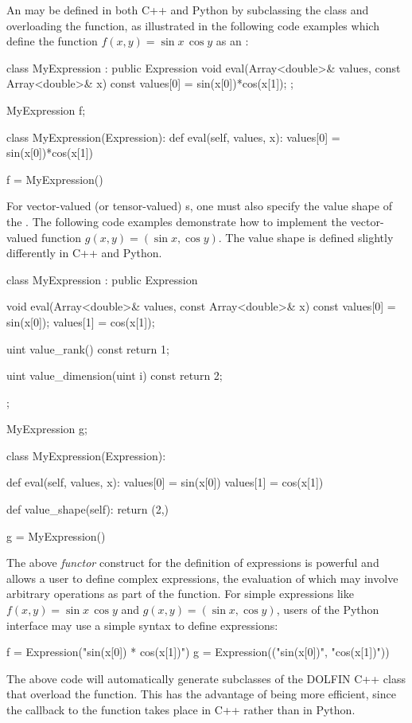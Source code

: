 An  may be defined in both C++ and Python by
subclassing the  class and overloading the 
function, as illustrated in the following code examples which define
the function $f(x, y) = \sin x \, \cos y$ as an :
\begin{c++}
class MyExpression : public Expression
{
  void eval(Array<double>& values, const Array<double>& x) const
  {
    values[0] = sin(x[0])*cos(x[1]);
  }
};

MyExpression f;
\end{c++}
\begin{python}
class MyExpression(Expression):
    def eval(self, values, x):
        values[0] = sin(x[0])*cos(x[1])

f = MyExpression()
\end{python}
For vector-valued (or tensor-valued) s, one must also
specify the value shape of the . The following code
examples demonstrate how to implement the vector-valued function $g(x,
y) = (\sin x, \cos y)$. The value shape is defined slightly
differently in C++ and Python.
\begin{c++}
class MyExpression : public Expression
{
  void eval(Array<double>& values, const Array<double>& x) const
  {
    values[0] = sin(x[0]);
    values[1] = cos(x[1]);
  }

  uint value_rank() const
  {
    return 1;
  }

  uint value_dimension(uint i) const
  {
    return 2;
  }
};

MyExpression g;
\end{c++}
\begin{python}
class MyExpression(Expression):

    def eval(self, values, x):
        values[0] = sin(x[0])
        values[1] = cos(x[1])

    def value_shape(self):
        return (2,)

g = MyExpression()
\end{python}

The above \emph{functor} construct for the definition of expressions is
powerful and allows a user to define complex expressions, the evaluation
of which may involve arbitrary operations as part of the 
function. For simple expressions like $f(x, y) = \sin x \, \cos y$ and
$g(x, y) = (\sin x, \cos y)$, users of the Python interface may use a
simple syntax to define expressions:
\begin{python}
f = Expression("sin(x[0]) * cos(x[1])")
g = Expression(("sin(x[0])", "cos(x[1])"))
\end{python}
The above code will automatically generate subclasses of the DOLFIN C++
 class that overload the  function. This has the
advantage of being more efficient, since the callback to the 
function takes place in C++ rather than in Python.

